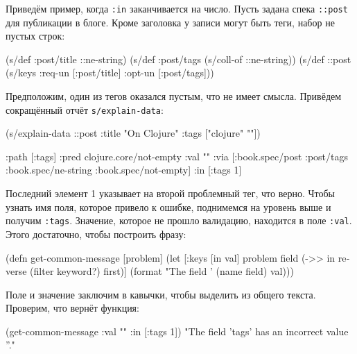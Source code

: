 Приведём пример, когда \verb|:in| заканчивается на число. Пусть задана
спека \verb|::post| для публикации в блоге. Кроме заголовка у записи могут
быть теги, набор не пустых строк:

\begin{english}
  \begin{clojure}
(s/def :post/title ::ne-string)
(s/def :post/tags (s/coll-of ::ne-string))
(s/def ::post (s/keys :req-un [:post/title]
                      :opt-un [:post/tags]))
  \end{clojure}
\end{english}

Предположим, один из тегов оказался пустым, что не имеет смысла. Привёдем
сокращённый отчёт \verb|s/explain-data|:

\begin{english}
  \begin{clojure}
(s/explain-data ::post {:title "On Clojure"
                        :tags ["clojure" ""]})

{:path [:tags]
 :pred clojure.core/not-empty
 :val ""
 :via [:book.spec/post
       :post/tags
       :book.spec/ne-string
       :book.spec/not-empty]
 :in [:tags 1]}
  \end{clojure}
\end{english}

Последний элемент 1 указывает на второй проблемный тег, что верно. Чтобы узнать
имя поля, которое привело к ошибке, поднимемся на уровень выше и получим
\verb|:tags|. Значение, которое не прошло валидацию, находится в поле
\verb|:val|. Этого достаточно, чтобы построить фразу:

\begin{english}
  \begin{clojure}
(defn get-common-message [problem]
  (let [{:keys [in val]} problem
        field (->> in
                   reverse
                   (filter keyword?)
                   first)]
    (format "The field '%
            (name field) val)))
  \end{clojure}
\end{english}

Поле и значение заключим в кавычки, чтобы выделить из общего текста. Проверим,
что вернёт функция:

\begin{english}
  \begin{clojure}
(get-common-message {:val "" :in [:tags 1]})
"The field 'tags' has an incorrect value ''."
  \end{clojure}
\end{english}

